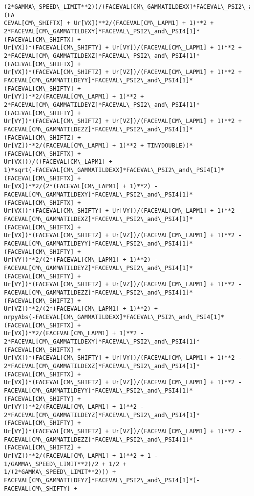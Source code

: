 \documentclass[landscape,letterpaper,10pt,english]{article}
\begin{document}
\begin{Verbatim}[commandchars=\\\{\}]
(2*GAMMA\_SPEED\_LIMIT**2))/(FACEVAL[CM\_GAMMATILDEXX]*FACEVAL\_PSI2\_and\_PSI4[1]*(FA
CEVAL[CM\_SHIFTX] + Ur[VX])**2/(FACEVAL[CM\_LAPM1] + 1)**2 +
2*FACEVAL[CM\_GAMMATILDEXY]*FACEVAL\_PSI2\_and\_PSI4[1]*(FACEVAL[CM\_SHIFTX] +
Ur[VX])*(FACEVAL[CM\_SHIFTY] + Ur[VY])/(FACEVAL[CM\_LAPM1] + 1)**2 +
2*FACEVAL[CM\_GAMMATILDEXZ]*FACEVAL\_PSI2\_and\_PSI4[1]*(FACEVAL[CM\_SHIFTX] +
Ur[VX])*(FACEVAL[CM\_SHIFTZ] + Ur[VZ])/(FACEVAL[CM\_LAPM1] + 1)**2 +
FACEVAL[CM\_GAMMATILDEYY]*FACEVAL\_PSI2\_and\_PSI4[1]*(FACEVAL[CM\_SHIFTY] +
Ur[VY])**2/(FACEVAL[CM\_LAPM1] + 1)**2 +
2*FACEVAL[CM\_GAMMATILDEYZ]*FACEVAL\_PSI2\_and\_PSI4[1]*(FACEVAL[CM\_SHIFTY] +
Ur[VY])*(FACEVAL[CM\_SHIFTZ] + Ur[VZ])/(FACEVAL[CM\_LAPM1] + 1)**2 +
FACEVAL[CM\_GAMMATILDEZZ]*FACEVAL\_PSI2\_and\_PSI4[1]*(FACEVAL[CM\_SHIFTZ] +
Ur[VZ])**2/(FACEVAL[CM\_LAPM1] + 1)**2 + TINYDOUBLE))*(FACEVAL[CM\_SHIFTX] +
Ur[VX]))/((FACEVAL[CM\_LAPM1] +
1)*sqrt(-FACEVAL[CM\_GAMMATILDEXX]*FACEVAL\_PSI2\_and\_PSI4[1]*(FACEVAL[CM\_SHIFTX] +
Ur[VX])**2/(2*(FACEVAL[CM\_LAPM1] + 1)**2) -
FACEVAL[CM\_GAMMATILDEXY]*FACEVAL\_PSI2\_and\_PSI4[1]*(FACEVAL[CM\_SHIFTX] +
Ur[VX])*(FACEVAL[CM\_SHIFTY] + Ur[VY])/(FACEVAL[CM\_LAPM1] + 1)**2 -
FACEVAL[CM\_GAMMATILDEXZ]*FACEVAL\_PSI2\_and\_PSI4[1]*(FACEVAL[CM\_SHIFTX] +
Ur[VX])*(FACEVAL[CM\_SHIFTZ] + Ur[VZ])/(FACEVAL[CM\_LAPM1] + 1)**2 -
FACEVAL[CM\_GAMMATILDEYY]*FACEVAL\_PSI2\_and\_PSI4[1]*(FACEVAL[CM\_SHIFTY] +
Ur[VY])**2/(2*(FACEVAL[CM\_LAPM1] + 1)**2) -
FACEVAL[CM\_GAMMATILDEYZ]*FACEVAL\_PSI2\_and\_PSI4[1]*(FACEVAL[CM\_SHIFTY] +
Ur[VY])*(FACEVAL[CM\_SHIFTZ] + Ur[VZ])/(FACEVAL[CM\_LAPM1] + 1)**2 -
FACEVAL[CM\_GAMMATILDEZZ]*FACEVAL\_PSI2\_and\_PSI4[1]*(FACEVAL[CM\_SHIFTZ] +
Ur[VZ])**2/(2*(FACEVAL[CM\_LAPM1] + 1)**2) +
nrpyAbs(-FACEVAL[CM\_GAMMATILDEXX]*FACEVAL\_PSI2\_and\_PSI4[1]*(FACEVAL[CM\_SHIFTX] +
Ur[VX])**2/(FACEVAL[CM\_LAPM1] + 1)**2 -
2*FACEVAL[CM\_GAMMATILDEXY]*FACEVAL\_PSI2\_and\_PSI4[1]*(FACEVAL[CM\_SHIFTX] +
Ur[VX])*(FACEVAL[CM\_SHIFTY] + Ur[VY])/(FACEVAL[CM\_LAPM1] + 1)**2 -
2*FACEVAL[CM\_GAMMATILDEXZ]*FACEVAL\_PSI2\_and\_PSI4[1]*(FACEVAL[CM\_SHIFTX] +
Ur[VX])*(FACEVAL[CM\_SHIFTZ] + Ur[VZ])/(FACEVAL[CM\_LAPM1] + 1)**2 -
FACEVAL[CM\_GAMMATILDEYY]*FACEVAL\_PSI2\_and\_PSI4[1]*(FACEVAL[CM\_SHIFTY] +
Ur[VY])**2/(FACEVAL[CM\_LAPM1] + 1)**2 -
2*FACEVAL[CM\_GAMMATILDEYZ]*FACEVAL\_PSI2\_and\_PSI4[1]*(FACEVAL[CM\_SHIFTY] +
Ur[VY])*(FACEVAL[CM\_SHIFTZ] + Ur[VZ])/(FACEVAL[CM\_LAPM1] + 1)**2 -
FACEVAL[CM\_GAMMATILDEZZ]*FACEVAL\_PSI2\_and\_PSI4[1]*(FACEVAL[CM\_SHIFTZ] +
Ur[VZ])**2/(FACEVAL[CM\_LAPM1] + 1)**2 + 1 - 1/GAMMA\_SPEED\_LIMIT**2)/2 + 1/2 +
1/(2*GAMMA\_SPEED\_LIMIT**2))) +
FACEVAL[CM\_GAMMATILDEYZ]*FACEVAL\_PSI2\_and\_PSI4[1]*(-FACEVAL[CM\_SHIFTY] +

\end{Verbatim}
\end{document}

